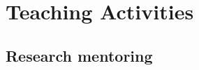 \documentclass[letterpaper]{article}
\renewenvironment{itemize}{
  \begin{list}{}{
    \setlength{\leftmargin}{1.5em}
  }
}{
  \end{list}
}
\begin{document}







\section*{Teaching Activities}

\subsection*{Research mentoring}
\end{document}
